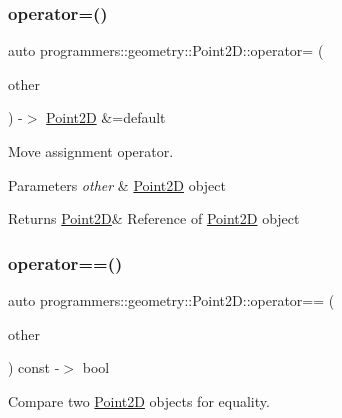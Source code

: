 \subsubsection{\texorpdfstring{operator=()}{operator=()}\hspace{0.1cm}{\footnotesize\ttfamily [2/2]}}
{\footnotesize\ttfamily auto programmers\+::geometry\+::\+Point2\+D\+::operator= (\begin{DoxyParamCaption}\item[{\hyperlink{classprogrammers_1_1geometry_1_1Point2D}{Point2D} \&\&}]{other }\end{DoxyParamCaption}) -\/$>$  \hyperlink{classprogrammers_1_1geometry_1_1Point2D}{Point2D} \&=default\hspace{0.3cm}{\ttfamily [default]}}



Move assignment operator. 


\begin{DoxyParams}{Parameters}
{\em other} & \hyperlink{classprogrammers_1_1geometry_1_1Point2D}{Point2D} object \\
\hline
\end{DoxyParams}
\begin{DoxyReturn}{Returns}
\hyperlink{classprogrammers_1_1geometry_1_1Point2D}{Point2D}\& Reference of \hyperlink{classprogrammers_1_1geometry_1_1Point2D}{Point2D} object 
\end{DoxyReturn}
\mbox{\label{classprogrammers_1_1geometry_1_1Point2D_a901c0de565aba1fd759ea5d3badcf318}} 
\subsubsection{\texorpdfstring{operator==()}{operator==()}}
{\footnotesize\ttfamily auto programmers\+::geometry\+::\+Point2\+D\+::operator== (\begin{DoxyParamCaption}\item[{const \hyperlink{classprogrammers_1_1geometry_1_1Point2D}{Point2D} \&}]{other }\end{DoxyParamCaption}) const -\/$>$  bool}



Compare two \hyperlink{classprogrammers_1_1geometry_1_1Point2D}{Point2D} objects for equality. 


